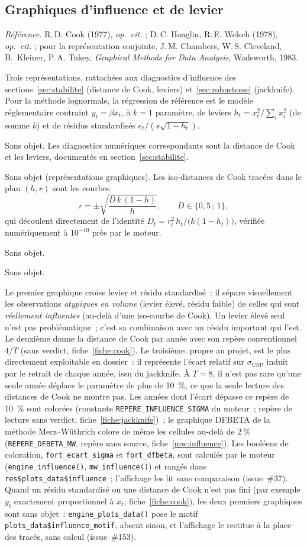 \documentclass[a4paper,11pt]{article}
\newcommand{\code}[1]{\texttt{\small #1}}
\newcommand{\refl}[1]{{\small\textcolor{maincolor!70!black}{\textit{Référence.} #1}}\par\smallskip}
\newcounter{ficheid}
\newenvironment{fiche}[1]{%
  \stepcounter{ficheid}%
  \phantomsection
  \subsection{#1}%
  \label{fiche:\theficheid}%
}{%
  \end{description}\vspace{0.5em}%
}
\newcommand{\Cadre}{%
  \begin{description}[leftmargin=0pt, style=unboxed, itemsep=3pt, topsep=3pt, parsep=2pt]%
  \item[\textcolor{financeblue}{\textbf{1. Cadre, notations et hypothèses de validité (non testées).}}]}
\newcommand{\Hzero}{\item[\textcolor{financeblue}{\textbf{2. Hypothèse nulle.}}]}
\newcommand{\Stat}{\item[\textcolor{financeblue}{\textbf{3. Statistique de test.}}]}
\newcommand{\Loi}{\item[\textcolor{financeblue}{\textbf{4. Loi sous $H_0$.}}]}
\newcommand{\Pval}{\item[\textcolor{financeblue}{\textbf{5. p-value.}}]}
\newcommand{\Usage}{\item[\textcolor{financeblue}{\textbf{6. Usage et limites.}}]}
\begin{document}
\begin{fiche}{Graphiques d'influence et de levier}
\label{fiche:graph-influence-levier}%
\refl{R.\,D. Cook (1977), \emph{op.\ cit.} ; D.\,C. Hoaglin, R.\,E. Welsch (1978),
\emph{op.\ cit.} ; pour la représentation conjointe, J.\,M. Chambers,
W.\,S. Cleveland, B.~Kleiner, P.\,A. Tukey, \emph{Graphical Methods for Data
Analysis}, Wadsworth, 1983.}
\Cadre
Trois représentations, rattachées aux diagnostics d'influence des
sections~\ref{sec:stabilite} (distance de Cook, leviers) et~\ref{sec:robustesse}
(jackknife). Pour la méthode lognormale, la régression de
référence est le modèle réglementaire contraint $y_t = \beta x_t$, à $k = 1$
paramètre, de leviers $h_t = x_t^2 / \sum_i x_i^2$ (de somme $k$) et de résidus
standardisés $e_t / (s\sqrt{1-h_t})$.
\Hzero
Sans objet. Les diagnostics numériques correspondants sont la distance de Cook et
les leviers, documentés en section~\ref{sec:stabilite}.
\Stat
Sans objet (représentations graphiques). Les iso-distances de Cook tracées dans
le plan $(h, r)$ sont les courbes
\[
  r = \pm\sqrt{\frac{D\,k\,(1-h)}{h}}, \qquad D \in \{0{,}5\,;\,1\},
\]
qui découlent directement de l'identité $D_t = r_t^2\,h_t / \big(k(1-h_t)\big)$,
vérifiée numériquement à $10^{-10}$ près par le moteur.
\Loi
Sans objet.
\Pval
Sans objet.
\Usage
Le premier graphique croise levier et résidu standardisé~: il sépare visuellement
les observations \emph{atypiques en volume} (levier élevé, résidu faible) de
celles qui sont \emph{réellement influentes} (au-delà d'une iso-courbe de Cook).
Un levier élevé seul n'est pas problématique~; c'est sa combinaison avec un
résidu important qui l'est. Le deuxième donne la distance de Cook par année avec
son repère conventionnel $4/T$ (sans verdict, fiche~\ref{fiche:cook}). Le troisième, propre au projet, est le plus directement
exploitable en dossier~: il représente l'écart relatif sur $\sigma_{\mathrm{USP}}$
induit par le retrait de chaque année, issu du jackknife. À $T = 8$, il n'est pas
rare qu'une seule année déplace le paramètre de plus de 10~\%, ce que la seule
lecture des distances de Cook ne montre pas. Les années dont l'écart dépasse ce repère de
10~\% sont colorées (constante \code{REPERE\_INFLUENCE\_SIGMA} du moteur~; repère de lecture sans
verdict, fiche~\ref{fiche:jackknife})~; le graphique DFBETA de la méthode Merz--Wüthrich colore
de même les cellules au-delà de $2~\%$ (\code{REPERE\_DFBETA\_MW}, repère sans source,
fiche~\ref{mw:influence}). Les booléens de coloration, \code{fort\_ecart\_sigma} et
\code{fort\_dfbeta}, sont calculés par le moteur (\code{engine\_influence()},
\code{mw\_influence()}) et rangés dans \code{res\$plots\_data\$influence}~; l'affichage les
lit sans comparaison (issue~\#37). Quand un résidu standardisé ou une distance de Cook n'est pas
fini (par exemple $y_t$ exactement proportionnel à $x_t$, fiche~\ref{fiche:cook}), les deux
premiers graphiques sont sans objet~: \code{engine\_plots\_data()} pose le motif
\code{plots\_data\$influence\_motif}, absent sinon, et l'affichage le restitue à la place des
tracés, sans calcul (issue~\#153).


\end{fiche}
\end{document}
